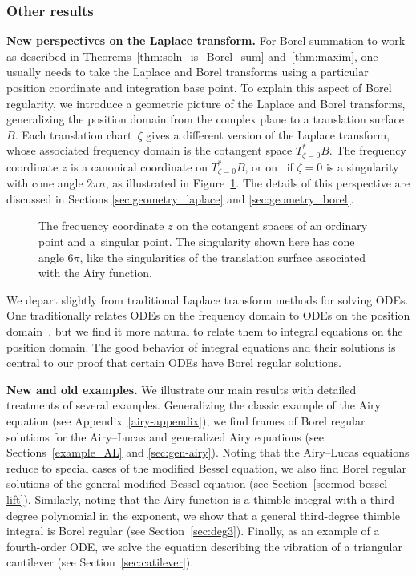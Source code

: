 \documentclass[pdftex]{sigma}
\numberwithin{equation}{section}
\begin{document}
\subsubsection{Other results}\label{sec:other_results}
%
{\bf New perspectives on the Laplace transform.}
%
For Borel summation to work as described in Theorems~\ref{thm:soln_is_Borel_sum} and~\ref{thm:maxim}, one usually needs to take the Laplace and Borel transforms using a particular position coordinate and integration base point. To explain this aspect of Borel regularity, we introduce a geometric picture of the Laplace and Borel transforms, generalizing the position domain from the complex plane to a translation surface $B$. Each translation chart~$\zeta$ gives a different version of the Laplace transform, whose associated frequency domain is the cotangent space $T^*_{\zeta = 0} B$. The frequency coordinate $z$ is a canonical coordinate on $T^*_{\zeta = 0}B$, or on~ if $\zeta = 0$ is a singularity with cone angle $2\pi n$, as illustrated in Figure~\ref{fig:geometric-picture-intro}. The details of this perspective are discussed in Sections \ref{sec:geometry_laplace} and \ref{sec:geometry_borel}.
\begin{figure}[t]\centering
\phaseSpaceLaplace

\vspace{2mm}

\caption{The frequency coordinate $z$ on the cotangent spaces of an ordinary point and a~singular point. The singularity shown here has cone angle $6\pi$, like the singularities of the translation surface associated with the Airy function.}\label{fig:geometric-picture-intro}
\end{figure}

We depart slightly from traditional Laplace transform methods for solving ODEs. One traditionally relates ODEs on the frequency domain to ODEs on the position domain~\cite{braaksma2006laplace,laplace-tfm}, but we find it more natural to relate them to integral equations on the position domain. The good behavior of integral equations and their solutions is central to our proof that certain ODEs have Borel regular solutions.

{\bf New and old examples.}
%
We illustrate our main results with detailed treatments of several examples. Generalizing the classic example of the Airy equation (see Appendix~\ref{airy-appendix}), we find frames of Borel regular solutions for the Airy--Lucas and generalized Airy equations (see Sections~\ref{example_AL} and \ref{sec:gen-airy}). Noting that the Airy--Lucas equations reduce to special cases of the modified Bessel equation, we also find Borel regular solutions of the general modified Bessel equation (see Section~\ref{sec:mod-bessel-lift}). Similarly, noting that the Airy function is a thimble integral with a third-degree polynomial in the exponent, we show that a general third-degree thimble integral is Borel regular (see Section~\ref{sec:deg3}). Finally, as an example of a fourth-order ODE, we solve the equation describing the vibration of a triangular cantilever (see Section~\ref{sec:catilever}).
\end{document}
